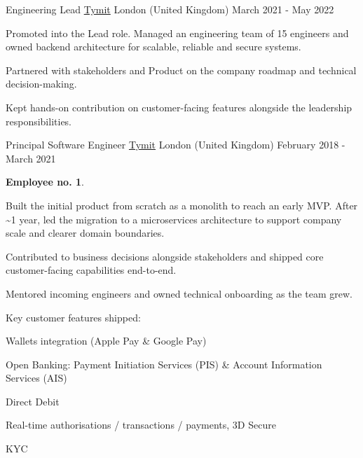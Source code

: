 \begin{cventries}
  \cventry
    {Engineering Lead} %
    {\href{https://tymit.com}{Tymit}} %
    {London (United Kingdom)} %
    {March 2021 - May 2022} %
    {
      \begin{cvitems} %
        \item[] Promoted into the Lead role. Managed an engineering team of 15 engineers and owned backend architecture for scalable, reliable and secure systems.
        \item[]
        \item[] Partnered with stakeholders and Product on the company roadmap and technical decision-making.
        \item[]
        \item[] Kept hands-on contribution on customer-facing features alongside the leadership responsibilities.
      \end{cvitems}
    }

  \cventry
    {Principal Software Engineer} %
    {\href{https://tymit.com}{Tymit}} %
    {London (United Kingdom)} %
    {February 2018 - March 2021} %
    {
      \begin{cvitems}%
        \item[]\textbf{Employee no. 1}.
        \item[]
        \item[] Built the initial product from scratch as a monolith to reach an early MVP. After \textasciitilde1 year, led the migration to a microservices architecture to support company scale and clearer domain boundaries.
        \item[]
        \item[] Contributed to business decisions alongside stakeholders and shipped core customer-facing capabilities end-to-end.
        \item[]
        \item[] Mentored incoming engineers and owned technical onboarding as the team grew.
        \item[]
        \item[] Key customer features shipped:
        \item[]
        \item {Wallets integration (Apple Pay \& Google Pay) }
        \item {Open Banking: Payment Initiation Services (PIS) \& Account Information Services (AIS) }
        \item {Direct Debit}
        \item {Real-time authorisations / transactions / payments, 3D Secure}
        \item {KYC}
      \end{cvitems}
    }


\end{cventries}
